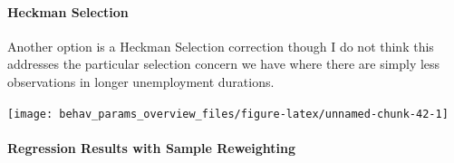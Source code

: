 \documentclass[
]{article}
\begin{document}
\paragraph{Heckman Selection}\label{heckman-selection}

Another option is a Heckman Selection correction though I do not think
this addresses the particular selection concern we have where there are
simply less observations in longer unemployment durations.

\begin{center}\texttt{[image: behav\_params\_overview\_files/figure-latex/unnamed-chunk-42-1]} \end{center}

\paragraph{Regression Results with Sample
Reweighting}\label{regression-results-with-sample-reweighting}
\end{document}

